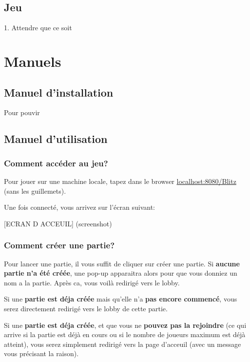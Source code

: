 \documentclass[11pt]{scrreprt}
\let\oldtabularx\tabularx
\let\endoldtabularx\endtabularx
\renewenvironment{tabularx}{\rowcolors{2}{white}{lightgray}\oldtabularx}{\endoldtabularx}
\begin{document}
    \section{Jeu}
    \begin{table}[H]
        \begin{tabularx}{\textwidth}{X|X}
            1. Attendre que ce soit
        \end{tabularx}
    \end{table}

    \chapter{Manuels}
    \section{Manuel d'installation}
    Pour pouvir

    \section{Manuel d'utilisation}
    \subsection{Comment accéder au jeu?}
    Pour jouer sur une machine locale, tapez dans le browser \og \url{localhost:8080/Blitz}\fg{} (sans les guillemets).

    Une fois connecté, vous arrivez sur l'écran suivant:

    [ECRAN D ACCEUIL] (screenshot)

    \subsection{Comment créer une partie?}
    Pour lancer une partie, il vous suffit de cliquer sur créer une partie.
    Si \textbf{aucune partie n'a été créée}, une pop-up apparaitra alors pour que vous donniez un nom a la partie. Après ca, vous voilà redirigé vers le lobby.

    Si une \textbf{partie est déja créée} mais qu'elle n'a \textbf{pas encore commencé}, vous serez directement redirigé vers le lobby de cette partie.

    Si une \textbf{partie est déja créée}, et que vous ne \textbf{pouvez pas la rejoindre} (ce qui arrive si la partie est déjà en cours ou si le nombre de joueurs maximum est déjà atteint), vous serez simplement redirigé vers la page d'acceuil (avec un message vous précisant la raison).
\end{document}
